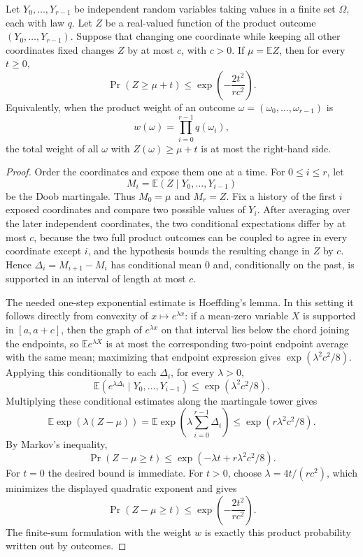 \begin{helper}
Let \(Y_0,\ldots,Y_{r-1}\) be independent random variables taking values in a
finite set \(\Omega\), each with law \(q\).  Let \(Z\) be a real-valued function
of the product outcome \((Y_0,\ldots,Y_{r-1})\).  Suppose that changing one
coordinate while keeping all other coordinates fixed changes \(Z\) by at most
\(c\), with \(c>0\).  If \(\mu=\mathbb E Z\), then for every \(t\ge0\),
\[
\Pr(Z\ge \mu+t)\le
\exp\!\left(-\frac{2t^2}{r c^2}\right).
\]
Equivalently, when the product weight of an outcome
\(\omega=(\omega_0,\ldots,\omega_{r-1})\) is
\[
w(\omega)=\prod_{i=0}^{r-1}q(\omega_i),
\]
the total weight of all \(\omega\) with \(Z(\omega)\ge\mu+t\) is at most the
right-hand side.
\end{helper}
\begin{proof}
Order the coordinates and expose them one at a time.  For \(0\le i\le r\), let
\[
M_i=\mathbb E(Z\mid Y_0,\ldots,Y_{i-1})
\]
be the Doob martingale.  Thus \(M_0=\mu\) and \(M_r=Z\).  Fix a history of the
first \(i\) exposed coordinates and compare two possible values of \(Y_i\).
After averaging over the later independent coordinates, the two conditional
expectations differ by at most \(c\), because the two full product outcomes can
be coupled to agree in every coordinate except \(i\), and the hypothesis bounds
the resulting change in \(Z\) by \(c\).  Hence
\(\Delta_i=M_{i+1}-M_i\) has conditional mean \(0\) and, conditionally on the
past, is supported in an interval of length at most \(c\).

The needed one-step exponential estimate is Hoeffding's lemma.  In this
setting it follows directly from convexity of \(x\mapsto e^{\lambda x}\):
if a mean-zero variable \(X\) is supported in \([a,a+c]\), then the graph of
\(e^{\lambda x}\) on that interval lies below the chord joining the endpoints,
so \(\mathbb E e^{\lambda X}\) is at most the corresponding two-point endpoint
average with the same mean; maximizing that endpoint expression gives
\(\exp(\lambda^2c^2/8)\).  Applying this conditionally to each
\(\Delta_i\), for every \(\lambda>0\),
\[
\mathbb E\!\left(e^{\lambda\Delta_i}\mid Y_0,\ldots,Y_{i-1}\right)
\le \exp(\lambda^2c^2/8).
\]
Multiplying these conditional estimates along the martingale tower gives
\[
\mathbb E\exp(\lambda(Z-\mu))
=\mathbb E\exp\!\left(\lambda\sum_{i=0}^{r-1}\Delta_i\right)
\le \exp(r\lambda^2c^2/8).
\]
By Markov's inequality,
\[
\Pr(Z-\mu\ge t)
\le \exp(-\lambda t+r\lambda^2c^2/8).
\]
For \(t=0\) the desired bound is immediate.  For \(t>0\), choose
\(\lambda=4t/(r c^2)\), which minimizes the displayed quadratic exponent and
gives
\[
\Pr(Z-\mu\ge t)\le
\exp\!\left(-\frac{2t^2}{r c^2}\right).
\]
The finite-sum formulation with the weight \(w\) is exactly this product
probability written out by outcomes.
\end{proof}
